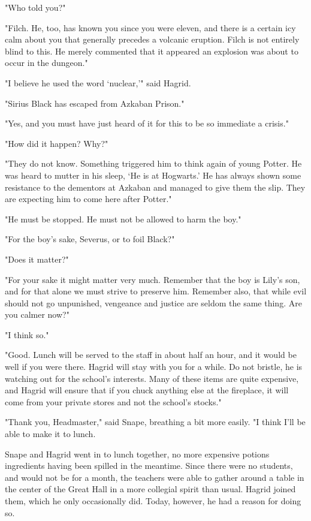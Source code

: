 "Who told you?"

"Filch. He, too, has known you since you were eleven, and there is a certain icy calm about you that generally precedes a volcanic eruption. Filch is not entirely blind to this. He merely commented that it appeared an explosion was about to occur in the dungeon."

"I believe he used the word `nuclear,'" said Hagrid.

"Sirius Black has escaped from Azkaban Prison."

"Yes, and you must have just heard of it for this to be so immediate a crisis."

"How did it happen? Why?"

"They do not know. Something triggered him to think again of young Potter. He was heard to mutter in his sleep, `He is at Hogwarts.' He has always shown some resistance to the dementors at Azkaban and managed to give them the slip. They are expecting him to come here after Potter."

"He must be stopped. He must not be allowed to harm the boy."

"For the boy's sake, Severus, or to foil Black?"

"Does it matter?"

"For your sake it might matter very much. Remember that the boy is Lily's son, and for that alone we must strive to preserve him. Remember also, that while evil should not go unpunished, vengeance and justice are seldom the same thing. Are you calmer now?"

"I think so."

"Good. Lunch will be served to the staff in about half an hour, and it would be well if you were there. Hagrid will stay with you for a while. Do not bristle, he is watching out for the school's interests. Many of these items are quite expensive, and Hagrid will ensure that if you chuck anything else at the fireplace, it will come from your private stores and not the school's stocks."

"Thank you, Headmaster," said Snape, breathing a bit more easily. "I think I'll be able to make it to lunch.

Snape and Hagrid went in to lunch together, no more expensive potions ingredients having been spilled in the meantime. Since there were no students, and would not be for a month, the teachers were able to gather around a table in the center of the Great Hall in a more collegial spirit than usual. Hagrid joined them, which he only occasionally did. Today, however, he had a reason for doing so.

